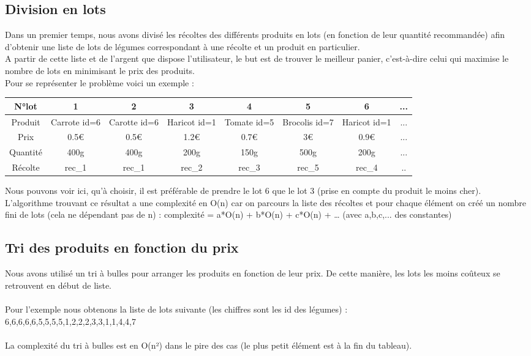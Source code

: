 \documentclass[12pt,titlepage]{report}
\begin{document}
\subsection{Division en lots}
Dans un premier temps, nous avons divisé les récoltes des différents produits en lots (en fonction de leur quantité recommandée) afin d’obtenir une liste de lots de légumes correspondant à une récolte et un produit en particulier. \\

A partir de cette liste et de l’argent que dispose l’utilisateur, le but est de trouver le meilleur panier, c'est-à-dire celui qui maximise le nombre de lots en minimisant le prix des produits. \\

\clearpage
Pour se représenter le problème voici un exemple :

\begin{center}
    \begin{tabular}{|c|c|c|c|c|c|c|c|}
    \hline
         N°lot & 1 & 2 & 3 & 4 & 5 & 6 & ... \\ \hline
        Produit & Carrote id=6 & Carotte id=6 & Haricot id=1 & Tomate id=5 & Brocolis id=7 & Haricot id=1 & ... \\ \hline
        Prix & 0.5€ & 0.5€ & 1.2€ & 0.7€ & 3€ & 0.9€ & ... \\ \hline
        Quantité & 400g & 400g & 200g & 150g & 500g & 200g & ...\\ \hline
        Récolte & rec_1 & rec_1 & rec_2 & rec_3 & rec_5 & rec_4 & ..\\ \hline
    \end{tabular}    
\end{center}


Nous pouvons voir ici, qu’à choisir, il est préférable de prendre le lot 6 que le lot 3 (prise en compte du produit le moins cher).\\
L'algorithme trouvant ce résultat a une complexité en O(n) car on parcours la liste des récoltes et pour chaque élément on créé un nombre fini de lots (cela ne dépendant pas de n) : complexité = a*O(n) + b*O(n) + c*O(n) + … (avec a,b,c,... des constantes)


\subsection{Tri des produits en fonction du prix}

Nous avons utilisé un tri à bulles pour arranger les produits en fonction de leur prix. De cette manière, les lots les moins coûteux se retrouvent en début de liste. \\  \\
Pour l'exemple nous obtenons la liste de lots suivante (les chiffres sont les id des légumes) :\\ 6,6,6,6,6,5,5,5,5,1,2,2,2,3,3,1,1,4,4,7 \\ \\
La complexité du tri à bulles est en O(n²) dans le pire des cas (le plus petit élément est à la fin du tableau).
\end{document}
